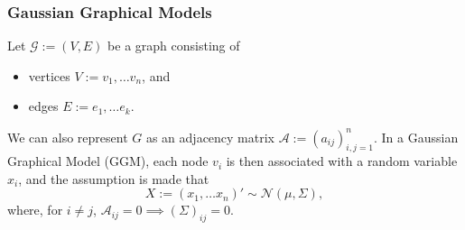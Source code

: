 \documentclass{beamer}
\begin{document}
\begin{frame}
  \frametitle{Gaussian Graphical Models}
  Let $\mathcal G := (V, E)$ be a graph consisting of 
  \begin{itemize}
    \item vertices $V := v_1, \ldots v_n$, and 
    \item edges $E := e_1, \ldots e_k$.
  \end{itemize}
  We can also represent $G$ as an adjacency matrix $\mathcal A := (a_{ij})_{i,j  = 1}^n$.
  \vfill 
  In a \alert{Gaussian Graphical Model} (GGM), each node $v_i$ is then associated with a random variable $x_i$, and the assumption is made that 
  \[
    X := (x_1, \ldots x_n)' \sim \mathcal N(\mu, \Sigma),
  \]
  where, for $i\ne j$, $\mathcal A_{ij} = 0 \implies (\Sigma)_{ij} = 0$.
\end{frame}
\end{document}
